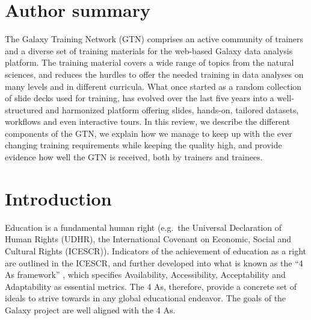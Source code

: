 \documentclass[10pt,letterpaper]{article}
\begin{document}
\section*{Author summary}
The Galaxy Training Network (GTN) comprises an active community of trainers and a diverse set of training materials for the web-based Galaxy data analysis platform. The training material covers a wide range of topics from the natural sciences, and reduces the hurdles to offer the needed training in data analyses on many levels and in different curricula. What once started as a random collection of slide decks used for training, has evolved over the last five years into a well-structured and harmonized platform offering slides, hands-on, tailored datasets, workflows and even interactive tours. 
In this review, we describe the different components of the GTN, we explain how we manage to keep up with the ever changing training requirements while keeping the quality high, and provide evidence how well the GTN is received, both by trainers and trainees. 



\section*{Introduction}

Education is a fundamental human right (e.g.\ the Universal Declaration of Human Rights (UDHR), the International Covenant on Economic, Social and Cultural Rights (ICESCR)).
Indicators of the achievement of education as a right are outlined in the ICESCR, and further developed into what is known as the “4 As framework” \cite{tomavsevski2001human}, which specifies Availability, Accessibility, Acceptability and Adaptability as essential metrics.
The 4 As, therefore, provide a concrete set of ideals to strive towards in any global educational endeavor.
The goals of the Galaxy project are well aligned with the 4 As.
\end{document}
